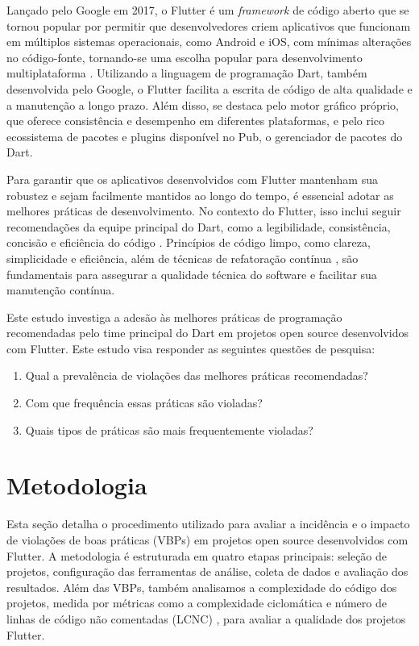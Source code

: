 \documentclass[12pt]{article}
\begin{document}
Lançado pelo Google em 2017, o Flutter é um \textit{framework} de código aberto que se tornou popular por permitir que desenvolvedores criem aplicativos que funcionam em múltiplos sistemas operacionais, como Android e iOS, com mínimas alterações no código-fonte, tornando-se uma escolha popular para desenvolvimento multiplataforma \cite{flutter}. Utilizando a linguagem de programação Dart, também desenvolvida pelo Google, o Flutter facilita a escrita de código de alta qualidade e a manutenção a longo prazo. Além disso, se destaca pelo motor gráfico próprio, que oferece consistência e desempenho em diferentes plataformas, e pelo rico ecossistema de pacotes e plugins disponível no Pub, o gerenciador de pacotes do Dart.

Para garantir que os aplicativos desenvolvidos com Flutter mantenham sua robustez e sejam facilmente mantidos ao longo do tempo, é essencial adotar as melhores práticas de desenvolvimento. No contexto do Flutter, isso inclui seguir recomendações da equipe principal do Dart, como a legibilidade, consistência, concisão e eficiência do código \cite{dartBestPractices}. Princípios de código limpo, como clareza, simplicidade e eficiência, além de técnicas de refatoração contínua \cite{fowler1999refactoring}, são fundamentais para assegurar a qualidade técnica do software e facilitar sua manutenção contínua.

Este estudo investiga a adesão às melhores práticas de programação recomendadas pelo time principal do Dart em projetos open source desenvolvidos com Flutter. Este estudo visa responder as seguintes questões de pesquisa:
\begin{enumerate}
\item Qual a prevalência de violações das melhores práticas recomendadas?
\item Com que frequência essas práticas são violadas?
\item Quais tipos de práticas são mais frequentemente violadas?
\end{enumerate}

\section{Metodologia}

Esta seção detalha o procedimento utilizado para avaliar a incidência e o impacto de violações de boas práticas (VBPs) em projetos open source desenvolvidos com Flutter. A metodologia é estruturada em quatro etapas principais: seleção de projetos, configuração das ferramentas de análise, coleta de dados e avaliação dos resultados. Além das VBPs, também analisamos a complexidade do código dos projetos, medida por métricas como a complexidade ciclomática e número de linhas de código não comentadas (LCNC) \cite{mccabe1976complexity}, para avaliar a qualidade dos projetos Flutter.
\end{document}
